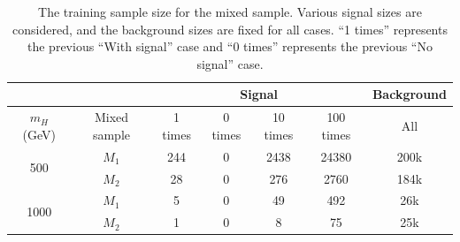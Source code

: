\documentclass[12pt]{article}
\begin{document}
        \begin{table}[htpb]
            \centering
            \caption{The training sample size for the mixed sample. Various signal sizes are considered, and the background sizes are fixed for all cases. ``1 times'' represents the previous ``With signal'' case and ``0 times'' represents the previous ``No signal'' case.}
            \label{tab:training_sample_size_cwola_hunting_enlarge_signal_size}
            \begin{tabular}{c|c|cccc|c}
                                      &              & \multicolumn{4}{c|}{Signal}              & Background \\ \hline
                $m_H$ (GeV)           & Mixed sample & 1 times & 0 times & 10 times & 100 times & All        \\ \hline
                \multirow{2}{*}{500}  & $M_1$        & 244     & 0       & 2438     & 24380     & 200k       \\
                                      & $M_2$        & 28      & 0       & 276      & 2760      & 184k       \\ \hline
                \multirow{2}{*}{1000} & $M_1$        & 5       & 0       & 49       & 492       & 26k        \\
                                      & $M_2$        & 1       & 0       & 8        & 75        & 25k
            \end{tabular}
        \end{table}
\end{document}
